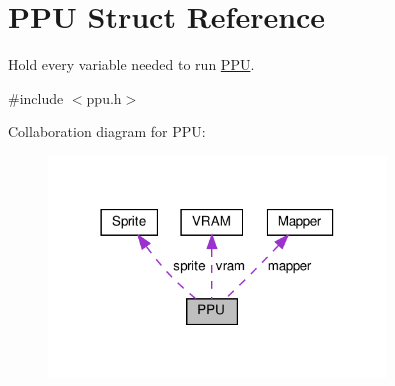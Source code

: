 \hypertarget{struct_p_p_u}{}\section{P\+PU Struct Reference}
\label{struct_p_p_u}


Hold every variable needed to run \hyperlink{struct_p_p_u}{P\+PU}.  




{\ttfamily \#include $<$ppu.\+h$>$}



Collaboration diagram for P\+PU\+:\nopagebreak
\begin{figure}[H]
\begin{center}
\leavevmode
\includegraphics[width=254pt]{struct_p_p_u__coll__graph}
\end{center}
\end{figure}
